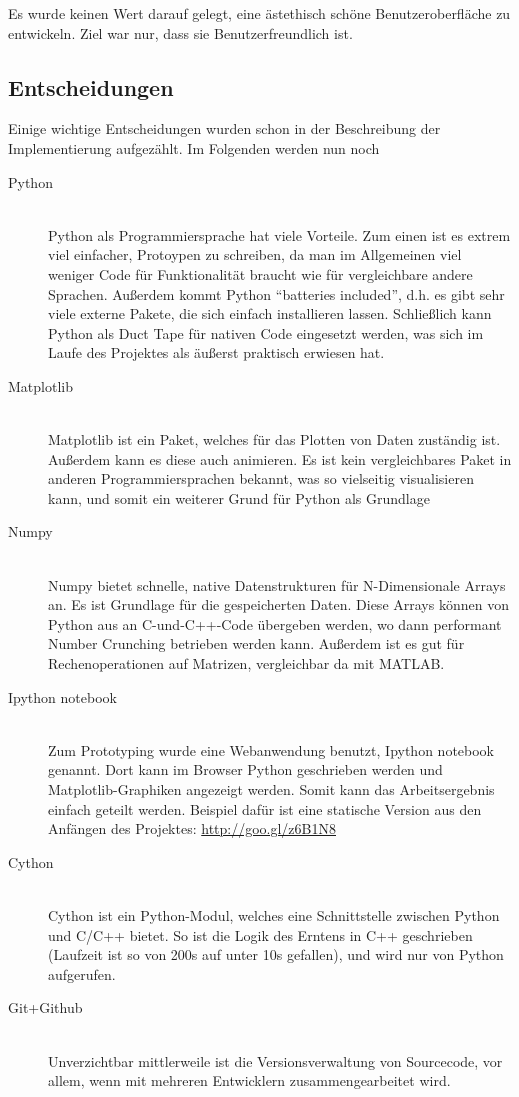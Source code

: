 \documentclass{article}
\begin{document}
Es wurde keinen Wert darauf gelegt, eine ästethisch schöne Benutzeroberfläche zu entwickeln. Ziel war nur, dass sie Benutzerfreundlich ist.

\subsection{Entscheidungen}

Einige wichtige Entscheidungen wurden schon in der Beschreibung der Implementierung aufgezählt. Im Folgenden werden nun
noch

\begin{description}
\item[Python] \hfill \\ Python als Programmiersprache hat viele Vorteile. Zum einen ist es extrem viel einfacher, Protoypen zu schreiben,
da man im Allgemeinen viel weniger Code für Funktionalität braucht wie für vergleichbare andere Sprachen. Außerdem kommt Python 
``batteries included'', d.h. es gibt sehr viele externe Pakete, die sich einfach installieren lassen. Schließlich kann Python
als Duct Tape für nativen Code eingesetzt werden, was sich im Laufe des Projektes als äußerst praktisch erwiesen hat.
\item[Matplotlib] \hfill \\ Matplotlib ist ein Paket, welches für das Plotten von Daten zuständig ist. Außerdem kann es diese auch animieren. Es ist kein vergleichbares Paket in anderen Programmiersprachen bekannt, was so vielseitig visualisieren kann, und somit ein weiterer Grund für Python als Grundlage 
\item[Numpy] \hfill \\ Numpy bietet schnelle, native Datenstrukturen für N-Dimensionale Arrays an. Es ist Grundlage für die gespeicherten Daten. Diese Arrays können von Python aus an C-und-C++-Code übergeben werden, wo dann performant Number Crunching betrieben werden kann. Außerdem ist es gut für Rechenoperationen auf Matrizen, vergleichbar da mit MATLAB.
\item[Ipython notebook] \hfill \\ Zum Prototyping wurde eine Webanwendung benutzt, Ipython notebook genannt. Dort kann im Browser Python geschrieben werden und Matplotlib-Graphiken angezeigt werden. Somit kann das Arbeitsergebnis einfach geteilt werden. Beispiel dafür ist eine statische Version aus den Anfängen des Projektes: \url{http://goo.gl/z6B1N8}
\item[Cython] \hfill \\ Cython ist ein Python-Modul, welches eine Schnittstelle zwischen Python und C/C++ bietet. So ist die Logik des Erntens in C++ geschrieben (Laufzeit ist so von 200s auf unter 10s gefallen), und wird nur von Python aufgerufen.
\item[Git+Github] \hfill \\ Unverzichtbar mittlerweile ist die Versionsverwaltung von Sourcecode, vor allem, wenn mit mehreren Entwicklern zusammengearbeitet wird. 
\end{description}
\end{document}
